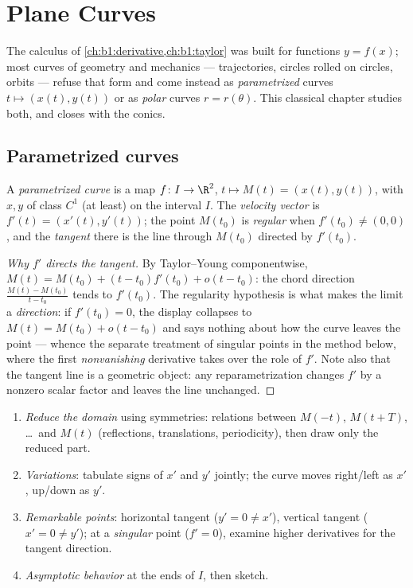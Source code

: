 \chapter{Plane Curves}\label{ch:b1:curves}

The calculus of \cref{ch:b1:derivative,ch:b1:taylor} was built for
functions $y = f(x)$; most curves of geometry and mechanics ---
trajectories, circles rolled on circles, orbits --- refuse that form
and come instead as \emph{parametrized} curves $t \mapsto (x(t),
y(t))$ or as \emph{polar} curves $r = r(\theta)$. This classical
chapter studies both, and closes with the conics.

\section{Parametrized curves}

\begin{definition}\label{def:b1:curves:def}
A \emph{parametrized curve} is a map $f
\colon I \to \R^2$, $t \mapsto M(t) = (x(t), y(t))$, with $x, y$ of
class $C^1$ (at least) on the interval $I$. The \emph{velocity
vector} is $f'(t) = (x'(t), y'(t))$; the point $M(t_0)$ is
\emph{regular} when $f'(t_0) \neq (0,0)$, and the \emph{tangent}
there is the line through $M(t_0)$ directed by $f'(t_0)$.
\end{definition}

\begin{proof}[Why $f'$ directs the tangent]
By Taylor--Young componentwise, $M(t) = M(t_0) + (t - t_0) f'(t_0) +
o(t - t_0)$: the chord direction $\frac{M(t) - M(t_0)}{t - t_0}$
tends to $f'(t_0)$. The regularity hypothesis is what makes the
limit a \emph{direction}: if $f'(t_0) = 0$, the display collapses
to $M(t) = M(t_0) + o(t - t_0)$ and says nothing about how the
curve leaves the point --- whence the separate treatment of
singular points in the method below, where the first
\emph{nonvanishing} derivative takes over the role of $f'$.
Note also that the tangent line is a geometric object: any
reparametrization changes $f'$ by a nonzero scalar factor and
leaves the line unchanged.
\end{proof}

\begin{method}\label{met:b1:curves:study}
\begin{enumerate}
  \item \emph{Reduce the domain} using symmetries: relations between
        $M(-t)$, $M(t + T)$, \dots\ and $M(t)$ (reflections,
        translations, periodicity), then draw only the reduced part.
  \item \emph{Variations}: tabulate signs of $x'$ and $y'$ jointly;
        the curve moves right/left as $x'$, up/down as $y'$.
  \item \emph{Remarkable points}: horizontal tangent ($y' = 0 \neq
        x'$), vertical tangent ($x' = 0 \neq y'$); at a
        \emph{singular} point ($f' = 0$), examine higher derivatives
        for the tangent direction.
  \item \emph{Asymptotic behavior} at the ends of $I$, then sketch.
\end{enumerate}
\end{method}

